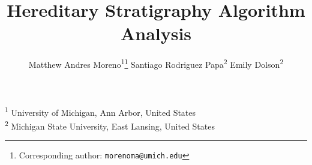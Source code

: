 \title{ Hereditary Stratigraphy Algorithm Analysis }
\author{
    Matthew Andres Moreno\textsuperscript{1}\thanks{Corresponding author: \texttt{morenoma@umich.edu}} \quad
    Santiago Rodriguez Papa\textsuperscript{2} \quad
    Emily Dolson\textsuperscript{2}
}
\date{}

\newcommand{\affil}[1]{\textsuperscript{#1}}
\newcommand{\affiliations}{
    \affil{1} University of Michigan, Ann Arbor, United States \\
    \affil{2} Michigan State University, East Lansing, United States
}

\maketitle

\begin{center}
\affiliations
\end{center}


